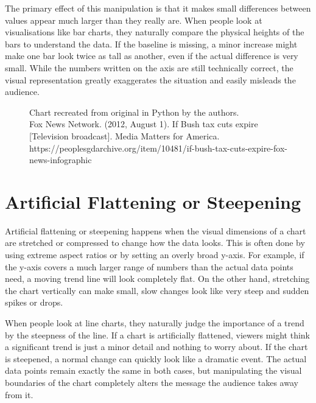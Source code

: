 The primary effect of this manipulation is that it makes small differences between values appear much larger than they really are. When people look at visualisations like bar charts, they naturally compare the physical heights of the bars to understand the data. If the baseline is missing, a minor increase might make one bar look twice as tall as another, even if the actual difference is very small. While the numbers written on the axis are still technically correct, the visual representation greatly exaggerates the situation and easily misleads the audience.

\begin{figure}[htbp]
    \centering
    
    \caption[Fox News Tax Cuts Broadcast (2012).]{Chart recreated from original in Python by the authors. \\ Fox News Network. (2012, August 1). If Bush tax cuts expire [Television broadcast]. Media Matters for America. https://peoplesgdarchive.org/item/10481/if-bush-tax-cuts-expire-fox-news-infographic}
    \label{fig:axis_truncation}
\end{figure}

\newpage
\section{Artificial Flattening or Steepening}
Artificial flattening or steepening happens when the visual dimensions of a chart are stretched or compressed to change how the data looks. This is often done by using extreme aspect ratios or by setting an overly broad y-axis. For example, if the y-axis covers a much larger range of numbers than the actual data points need, a moving trend line will look completely flat. On the other hand, stretching the chart vertically can make small, slow changes look like very steep and sudden spikes or drops.

When people look at line charts, they naturally judge the importance of a trend by the steepness of the line. If a chart is artificially flattened, viewers might think a significant trend is just a minor detail and nothing to worry about. If the chart is steepened, a normal change can quickly look like a dramatic event. The actual data points remain exactly the same in both cases, but manipulating the visual boundaries of the chart completely alters the message the audience takes away from it.

